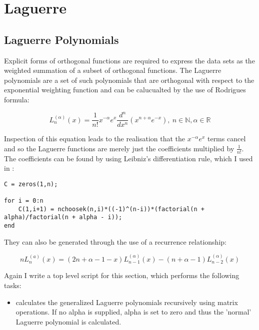 \documentclass{article}
\begin{document}
\section{Laguerre}

\subsection{Laguerre Polynomials} 

Explicit forms of orthogonal functions are required to express the data sets as the weighted summation of a subset of orthogonal functions. The Laguerre polynomials are a set of such polynomials that are orthogonal with respect to the exponential weighting function and can be calucualted by the use of Rodrigues formula:

\begin{equation}
L_n^{(\alpha)}(x) = \frac{1}{n!} x^{-\alpha} e^x \frac{d^n}{dx^n}(x^{n+\alpha} e^{-x}), \  n \in  \mathbb{N}, \alpha \in \mathbb{R} 
\end{equation}

Inspection of this equation leads to the realisation that the $x^{-\alpha} e^x$ terms cancel and so the Laguerre functions are merely just the coefficients multiplied by $\frac{1}{n!}$. The coefficients can be found by using Leibniz's differentiation rule, which I used in  :

\begin{lstlisting}
C = zeros(1,n);

for i = 0:n
    C(1,i+1) = nchoosek(n,i)*((-1)^(n-i))*(factorial(n + alpha)/factorial(n + alpha - i));
end
\end{lstlisting}

They can also be generated through the use of a recurrence relationship:

\begin{equation}
nL_n^{(a)}(x) = (2n + \alpha - 1 - x)L_{n-1}^{(\alpha)}(x) - (n + \alpha - 1)L_{n-2}^{(\alpha)}(x)   
\end{equation}


Again I write a top level script for this section, which performs the following tasks:

\begin{itemize}

\item {} calculates the generalized Laguerre polynomials recursively using matrix operations. If no alpha is supplied, alpha is set to zero and thus the 'normal' Laguerre polynomial is calculated.

\end{itemize}
\end{document}
